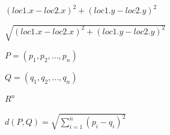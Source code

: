 \documentclass{article}
\begin{document}
$ (loc1.x - loc2.x)^2 + (loc1.y - loc2.y)^2 $
\pagebreak

$ \sqrt{ (loc1.x - loc2.x)^2 + (loc1.y - loc2.y)^2 } $
\pagebreak

$ P=(p_1, p_2, ... , p_n) $
\pagebreak

$ Q=(q_1, q_2, ... , q_n) $
\pagebreak

$ R^n $
\pagebreak

$ d(P,Q)=\sqrt{ \sum_{i=1}^{n} (p_i-q_i)^{2} } $
\pagebreak
\end{document}
